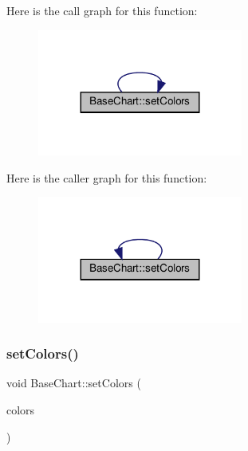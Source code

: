 Here is the call graph for this function\+:
\nopagebreak
\begin{figure}[H]
\begin{center}
\leavevmode
\includegraphics[width=191pt]{class_base_chart_a723ac51f36ac8d8ed451a24665935229_cgraph}
\end{center}
\end{figure}
Here is the caller graph for this function\+:
\nopagebreak
\begin{figure}[H]
\begin{center}
\leavevmode
\includegraphics[width=191pt]{class_base_chart_a723ac51f36ac8d8ed451a24665935229_icgraph}
\end{center}
\end{figure}
\mbox{\label{class_base_chart_a9f8769cbd1e4c964d154303765d2bd8e}} 
\subsubsection{\texorpdfstring{set\+Colors()}{setColors()}\hspace{0.1cm}{\footnotesize\ttfamily [4/4]}}
{\footnotesize\ttfamily void Base\+Chart\+::set\+Colors (\begin{DoxyParamCaption}\item[{\hyperlink{class_int_array}{Int\+Array}}]{colors }\end{DoxyParamCaption})\hspace{0.3cm}{\ttfamily [inline]}}



